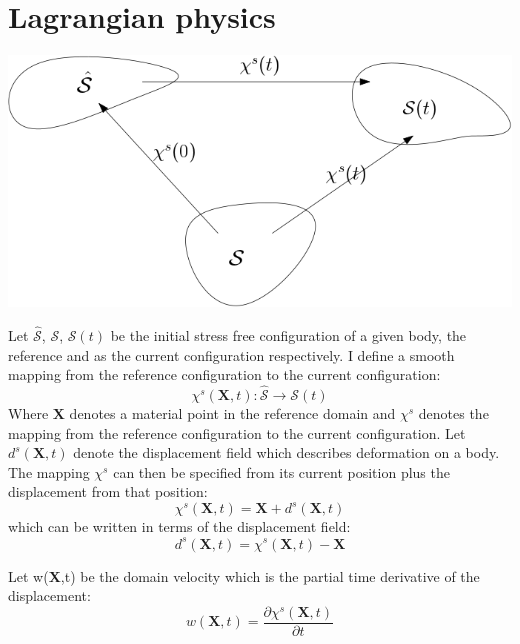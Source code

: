 \section{Lagrangian physics}

\begin{center}
\includegraphics[scale=0.4]{continuum_mapping.png}
\end{center}
Let $ \hat{\mathcal{S}}$, $\mathcal{S}$, $\mathcal{S}(t)$ be the initial stress free configuration of a given body, the reference and  as the current configuration respectively.
I define a smooth mapping from the reference configuration to the current configuration:
\begin{equation}
\chi^s(\textbf{X},t) : \hat{\mathcal{S}} \rightarrow \mathcal{S}(t)     
\end{equation}
Where $\textbf{X}$ denotes a material point in the reference domain and $\chi^s$ denotes the mapping from the reference configuration to the current configuration. Let $d^s(\textbf{X},t)$ denote the displacement field which describes deformation on a body. The mapping $\chi^s$ can then be specified from its current position plus the displacement from that position:
\begin{equation} \label{eq:chi}
 \chi^s(\textbf{X},t) = \textbf{X}  + d^s(\textbf{X} ,t) 
\end{equation}
which can be written in terms of the displacement field:
\begin{equation}
 d^s(\textbf{X},t) = \chi^s(\textbf{X},t) -\textbf{X}   
\end{equation}

Let w(\textbf{X},t) be the domain velocity which is the partial time derivative of the displacement: 
\begin{equation}
 w(\textbf{X},t) = \frac{\partial \chi^s(\textbf{X},t)}{\partial t}   
\end{equation}

